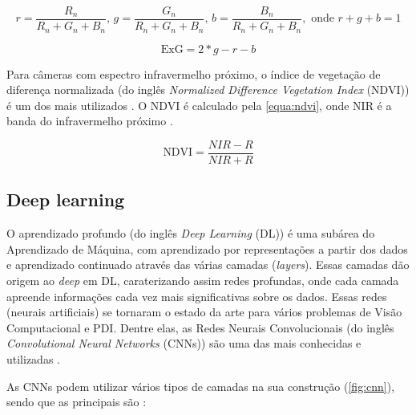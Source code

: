 \documentclass[12pt, a4paper, english, brazil]{article}
\begin{document}
\begin{equation}
    r = \frac{R_n}{R_n + G_n + B_n} \text{, } g = \frac{G_n}{R_n + G_n + B_n} \text{, } b = \frac{B_n}{R_n + G_n + B_n}, \text{ onde } r + g + b = 1
    \label{equa:chromatic}
\end{equation}

\begin{equation}
    \text{ExG} = 2 * g - r - b
    \label{equa:exg}
\end{equation}

Para câmeras com espectro infravermelho próximo, o 
índice de vegetação de diferença normalizada (do inglês \textit{Normalized Difference Vegetation Index} (NDVI)) é um dos mais utilizados \cite{Pereira_Junior_2020}. O NDVI é calculado pela \autoref{equa:ndvi}, onde NIR é a banda do infravermelho próximo \cite{Candiago_2015}.

\begin{equation}
    \text{NDVI} = \frac{NIR - R}{NIR + R}
    \label{equa:ndvi}
\end{equation}

\subsection{Deep learning} \label{sec:dl}

O aprendizado profundo (do inglês \textit{Deep Learning} (DL)) é uma subárea do Aprendizado de Máquina, com aprendizado por representações a partir dos dados e aprendizado continuado através das várias camadas (\textit{layers}). Essas camadas dão origem ao \textit{deep} em DL, caraterizando assim redes profundas, onde cada camada apreende informações cada vez mais significativas sobre os dados. Essas redes (neurais artificiais) se tornaram o estado da arte para vários problemas de Visão Computacional e PDI. Dentre elas, as Redes Neurais Convolucionais (do inglês \textit{Convolutional Neural Networks} (CNNs)) são uma das mais conhecidas e utilizadas \cite{Ponti_2017}.

As CNNs podem utilizar vários tipos de camadas na sua construção (\autoref{fig:cnn}), sendo que as principais são \cite{Rawat_Wang_2017}:
\end{document}

